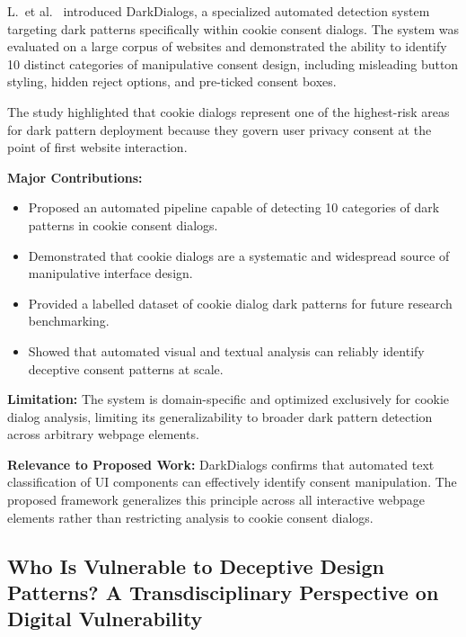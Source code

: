 L.~et al.~\cite{darkdialogs2023} introduced DarkDialogs, a specialized automated detection system targeting dark patterns specifically within cookie consent dialogs. The system was evaluated on a large corpus of websites and demonstrated the ability to identify 10 distinct categories of manipulative consent design, including misleading button styling, hidden reject options, and pre-ticked consent boxes.

The study highlighted that cookie dialogs represent one of the highest-risk areas for dark pattern deployment because they govern user privacy consent at the point of first website interaction.

\vspace{0.3cm}

\textbf{Major Contributions:}
\begin{itemize}
\item Proposed an automated pipeline capable of detecting 10 categories of dark patterns in cookie consent dialogs.
\item Demonstrated that cookie dialogs are a systematic and widespread source of manipulative interface design.
\item Provided a labelled dataset of cookie dialog dark patterns for future research benchmarking.
\item Showed that automated visual and textual analysis can reliably identify deceptive consent patterns at scale.
\end{itemize}

\vspace{0.3cm}

\textbf{Limitation:}
The system is domain-specific and optimized exclusively for cookie dialog analysis, limiting its generalizability to broader dark pattern detection across arbitrary webpage elements.

\vspace{0.3cm}

\textbf{Relevance to Proposed Work:}
DarkDialogs confirms that automated text classification of UI components can effectively identify consent manipulation. The proposed framework generalizes this principle across all interactive webpage elements rather than restricting analysis to cookie consent dialogs.


\subsection{Who Is Vulnerable to Deceptive Design Patterns? A Transdisciplinary Perspective on Digital Vulnerability}

